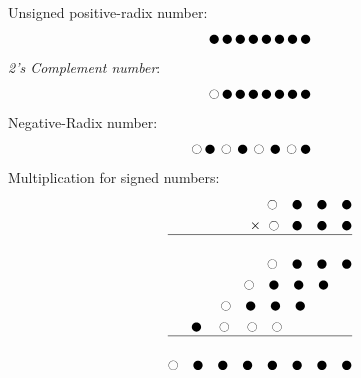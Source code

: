\paragraph{}
Unsigned positive-radix number: \begin{align*}
		\newmoon\,\newmoon\,\newmoon\,\newmoon\,\newmoon\,\newmoon\,\newmoon\,\newmoon
\end{align*}
\textit{2's Complement number}:\begin{align*}
		\ocircle\,\newmoon\,\newmoon\,\newmoon\,\newmoon\,\newmoon\,\newmoon\,\newmoon
\end{align*}
Negative-Radix number:\begin{align*}
		\ocircle\,\newmoon\,\ocircle\,\newmoon\,\ocircle\,\newmoon\,\ocircle\newmoon\,\quad
\end{align*}
Multiplication for signed numbers:
\begin{align*}
	\ocircle\quad\newmoon\quad\newmoon\quad\newmoon \\
	\mathcal{\times}\,\,\ocircle\,\,\,\,\newmoon\quad\newmoon\quad\newmoon\\
	\hline\\
	\ocircle\quad\newmoon\quad\newmoon\quad\newmoon\\
	\ocircle\quad\newmoon\quad\newmoon\quad\newmoon\quad\,\,\,\,\\
	\ocircle\quad\newmoon\quad\newmoon\quad\newmoon\qquad\quad\,\,\\
	\newmoon\quad\ocircle\quad\ocircle\quad\ocircle\quad\qquad\qquad\\
	\hline\\
	\ocircle\quad\newmoon\quad\newmoon\quad\newmoon\quad\newmoon\quad\newmoon\quad\newmoon\quad\newmoon
\end{align*}\\

